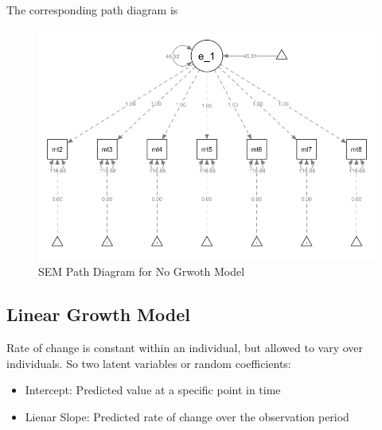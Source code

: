 The corresponding path diagram is 
\begin{figure}[ht]
    \centering
    \includegraphics{images/005_no_growth_model_path.png}
    \caption{SEM Path Diagram for No Grwoth Model}
    \label{fig:sem_no_growth_path}
\end{figure}


\subsection{Linear Growth Model} 
Rate of change is constant within an individual, but allowed to vary over individuals. So two latent variables or random coefficients: 
    \begin{itemize}
        \item Intercept: Predicted value at a specific point in time 
        \item Lienar Slope: Predicted rate of change over the observation period 
    \end{itemize}

